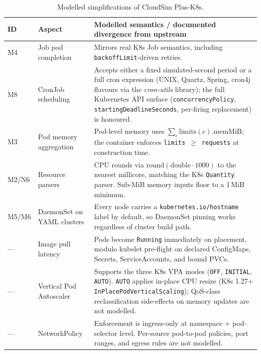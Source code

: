 \documentclass[ASNA,twocolumn]{USG}
\newcommand{\ckm}{CloudSim Plus-K8s\xspace}
\begin{document}
    \begin{table}[!t]
        \centering
        \caption{Modelled simplifications of \ckm.\label{tab:simplifications}}
        \footnotesize
        \setlength{\tabcolsep}{4pt}
        \begin{tabular*}{\textwidth}{@{\extracolsep{\fill}}@{}l p{} p{}@{}}
\toprule
\textbf{ID} & \textbf{Aspect} & \textbf{Modelled semantics / documented divergence from upstream} \\
\midrule
M4              & Job pod completion            & Mirrors real K8s Job semantics, including \texttt{backoffLimit}-driven retries. \\
\addlinespace
M8              & CronJob scheduling            & Accepts either a fixed simulated-second period or a full cron expression (UNIX, Quartz, Spring, cron4j flavours via the \emph{cron-utils} library); the full Kubernetes API surface (\texttt{concurrencyPolicy}, \texttt{startingDeadlineSeconds}, per-firing replacement) is honoured. \\
\addlinespace
M3              & Pod memory aggregation        & Pod-level memory uses $\sum_c \mathrm{limits}(c).\mathrm{memMiB}$; the container enforces \texttt{limits}~$\geq$~\texttt{requests} at construction time. \\
\addlinespace
M2/N6           & Resource parsers              & CPU rounds via $\mathrm{round}(\text{double} \cdot 1000)$ to the nearest millicore, matching the K8s \texttt{Quantity} parser. Sub-MiB memory inputs floor to a 1\,MiB minimum. \\
\addlinespace
M5/M6           & DaemonSet on YAML clusters    & Every node carries a \texttt{kubernetes.io/hostname} label by default, so DaemonSet pinning works regardless of cluster build path. \\
\addlinespace
---             & Image pull latency            & Pods become \texttt{Running} immediately on placement, modulo kubelet pre-flight on declared ConfigMaps, Secrets, ServiceAccounts, and bound PVCs. \\
\addlinespace
---             & Vertical Pod Autoscaler       & Supports the three K8s VPA modes (\texttt{OFF}, \texttt{INITIAL}, \texttt{AUTO}). \texttt{AUTO} applies in-place CPU resize (K8s 1.27+ \texttt{InPlacePodVerticalScaling}); QoS-class reclassification side-effects on memory updates are not modelled. \\
\addlinespace
---             & NetworkPolicy                 & Enforcement is ingress-only at namespace + pod-selector level. Per-source pod-to-pod policies, port ranges, and egress rules are not modelled. \\

\end{tabular*}
\end{table}
\end{document}
